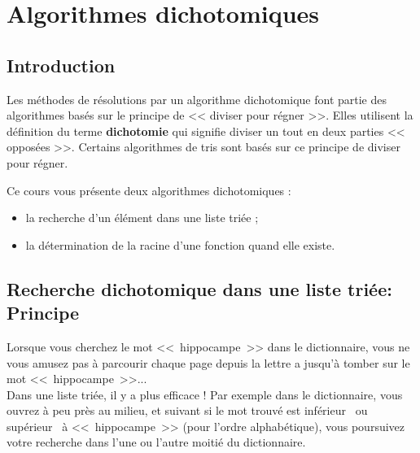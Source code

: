 \setchapterpreamble[u]{\margintoc}
\chapter{Algorithmes dichotomiques}




\section{Introduction}
Les méthodes de résolutions par un algorithme dichotomique font partie des algorithmes basés sur le principe de << diviser pour régner >>.
Elles utilisent la définition du terme \textbf{dichotomie} qui signifie diviser un tout en deux parties << opposées >>.
Certains algorithmes de tris sont basés sur ce principe de diviser pour régner.



Ce cours vous présente deux algorithmes dichotomiques :
\begin{itemize}
\item la recherche d'un élément dans une liste triée ;
\item la détermination de la racine d'une fonction quand elle existe.
\end{itemize}

\section{Recherche dichotomique dans une liste {triée}: Principe}

Lorsque vous cherchez le mot <<~hippocampe~>> dans le dictionnaire, vous ne vous amusez pas à parcourir chaque page depuis la lettre a jusqu'à tomber sur le mot <<~hippocampe~>>...\\
Dans une liste triée, il y a plus efficace ! Par exemple dans le dictionnaire, vous ouvrez à peu près au milieu, et suivant si le mot trouvé est \og inférieur \fg \ ou \og supérieur \fg \ à <<~hippocampe~>> (pour l'ordre alphabétique), vous poursuivez votre recherche dans l'une ou l'autre moitié du dictionnaire.


